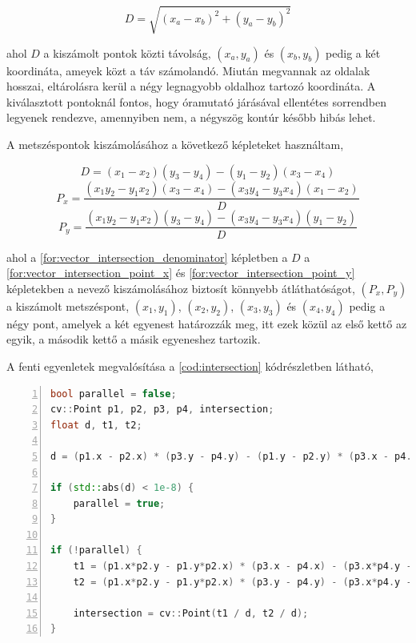 \begin{equation}
    D = \sqrt{(x_a-x_b)^2 + (y_a-y_b)^2}
    \label{for:vector_distance}
\end{equation}

\par ahol $D$ a kiszámolt pontok közti távolság, $(x_a,y_a)$ és $(x_b,y_b)$ pedig a két koordináta, ameyek közt a táv számolandó. Miután megvannak az oldalak hosszai, eltárolásra kerül a négy legnagyobb oldalhoz tartozó koordináta. A kiválasztott pontoknál fontos, hogy óramutató járásával ellentétes sorrendben legyenek rendezve, amennyiben nem, a négyszög kontúr később hibás lehet.
\par A metszéspontok kiszámolásához a következő képleteket \cite{line_line} használtam,

\begin{equation}
    D = (x_1 - x_2)(y_3 - y_4) - (y_1 - y_2)(x_3 - x_4)
    \label{for:vector_intersection_denominator}
\end{equation}
\begin{equation}
    P_x = \frac{(x_1y_2 - y_1x_2)(x_3 - x_4) - (x_3y_4 - y_3x_4)(x_1 - x_2)}{D}
    \label{for:vector_intersection_point_x}
\end{equation}
\begin{equation}
    P_y = \frac{(x_1y_2 - y_1x_2)(y_3 - y_4) - (x_3y_4 - y_3x_4)(y_1 - y_2)}{D}
    \label{for:vector_intersection_point_y}
\end{equation}

\par ahol a \ref{for:vector_intersection_denominator} képletben a $D$ a \ref{for:vector_intersection_point_x} és \ref{for:vector_intersection_point_y} képletekben a nevező kiszámolásához biztosít könnyebb átláthatóságot, $(P_x, P_y)$ a kiszámolt metszéspont, $(x_1, y_1)$, $(x_2, y_2)$, $(x_3, y_3)$ és $(x_4, y_4)$ pedig a négy pont, amelyek a két egyenest határozzák meg, itt ezek közül az első kettő az egyik, a második kettő a másik egyeneshez tartozik.
\par A fenti egyenletek megvalósítása a \ref{cod:intersection} kódrészletben látható,

\vspace{2mm}
\hspace{-10mm}
\begin{minipage}{\linewidth}
\begin{lstlisting}[language=C++, numbers=left, caption={Metszéspont kereső algoritmus.}, label={cod:intersection}]
bool parallel = false;
cv::Point p1, p2, p3, p4, intersection;
float d, t1, t2;

d = (p1.x - p2.x) * (p3.y - p4.y) - (p1.y - p2.y) * (p3.x - p4.x);

if (std::abs(d) < 1e-8) {
    parallel = true;
}

if (!parallel) {
    t1 = (p1.x*p2.y - p1.y*p2.x) * (p3.x - p4.x) - (p3.x*p4.y - p3.y*p4.x) * (p1.x - p2.x);
    t2 = (p1.x*p2.y - p1.y*p2.x) * (p3.y - p4.y) - (p3.x*p4.y - p3.y*p4.x) * (p1.y - p2.y);
    
    intersection = cv::Point(t1 / d, t2 / d);
}
\end{lstlisting}
\end{minipage}

